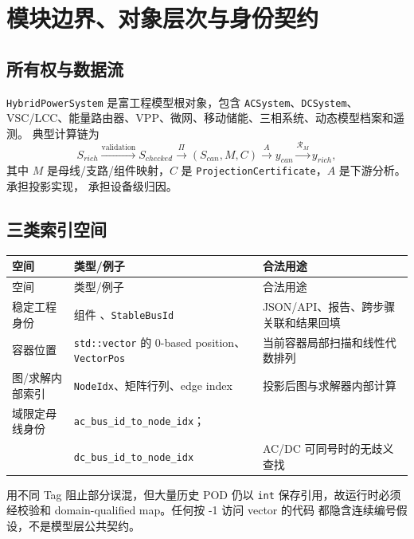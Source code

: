 \section{模块边界、对象层次与身份契约}

\subsection{所有权与数据流}

\texttt{HybridPowerSystem} 是富工程模型根对象，包含 \texttt{ACSystem}、\texttt{DCSystem}、
VSC/LCC、能量路由器、VPP、微网、移动储能、三相系统、动态模型档案和遥测。
典型计算链为
\begin{equation}
S_{rich}\xrightarrow{\text{validation}}
S_{checked}\xrightarrow{\Pi}
(S_{can},M,C)\xrightarrow{A}y_{can}\xrightarrow{\mathcal R_M}y_{rich},
\end{equation}
其中 $M$ 是母线/支路/组件映射，$C$ 是 \texttt{ProjectionCertificate}，$A$ 是下游分析。
 承担投影实现，
 承担设备级归因。

\subsection{三类索引空间}

\begin{center}\footnotesize
\begin{longtable}{@{}L{4.2cm}L{4.4cm}L{6.6cm}@{}}
\toprule
空间 & 类型/例子 & 合法用途\\\midrule
\endfirsthead
\toprule 空间 & 类型/例子 & 合法用途\\\midrule\endhead
稳定工程身份 & 组件 、\texttt{StableBusId} & JSON/API、报告、跨步骤关联和结果回填\\
容器位置 & \texttt{std::vector} 的 0-based position、\texttt{VectorPos} & 当前容器局部扫描和线性代数排列\\
图/求解内部索引 & \texttt{NodeIdx}、矩阵行列、edge index & 投影后图与求解器内部计算\\
域限定母线身份 & \texttt{ac\_bus\_id\_to\_node\_idx}；\\
& \texttt{dc\_bus\_id\_to\_node\_idx} & AC/DC 可同号时的无歧义查找\\
\bottomrule
\end{longtable}
\end{center}

 用不同 Tag 阻止部分误混，但大量历史 POD 仍以
\texttt{int} 保存引用，故运行时必须经校验和 domain-qualified map。任何按 -1 访问 vector 的代码
都隐含连续编号假设，不是模型层公共契约。

